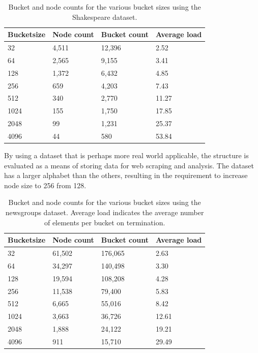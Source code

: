 \begin{table}[h]
    \centering
    \begin{tabular}[here]{ l l l l }
        \hline
        Bucketsize&  Node count & Bucket count& Average load  \\\hline
        32        &  4,511      & 12,396      & 2.52 \\
        64        &  2,565      & 9,155       & 3.41 \\
        128       &  1,372      & 6,432       & 4.85 \\
        256       &  659        & 4,203       & 7.43 \\
        512       &  340        & 2,770       & 11.27\\
        1024      &  155        & 1,750       & 17.85\\ 
        2048      &  99         & 1,231       & 25.37\\ 
        4096      &  44         & 580         & 53.84\\\hline 
    \end{tabular}
    \caption{Bucket and node counts for the various bucket sizes using the Shakespeare
        dataset.}
    \label{tab:bncounts_shakespeare}
\end{table}


By using a dataset that is perhaps more real world applicable, the structure is
evaluated as a means of storing data for web scraping and analysis. The dataset has a 
larger alphabet than the others, resulting in the requirement to increase
node size to 256 from 128.

\begin{table}[h]
    \centering
    \begin{tabular}[here]{ l l l l }
        \hline
        Bucketsize& Node count  & Bucket count & Average load  \\\hline
        32        &  61,502     & 176,065      & 2.63\\
        64        &  34,297     & 140,498      & 3.30\\
        128       &  19,594     & 108,208      & 4.28\\
        256       &  11,538     & 79,400       & 5.83\\
        512       &  6,665      & 55,016       & 8.42\\
        1024      &  3,663      & 36,726       & 12.61\\ 
        2048      &  1,888      & 24,122       & 19.21\\ 
        4096      &  911        & 15,710       & 29.49\\\hline 
    \end{tabular}
    \caption{Bucket and node counts for the various bucket sizes using the
    newsgroups dataset. Average load indicates the average number of elements
    per bucket on termination.}
    \label{tab:bncounts_ngrp}
\end{table}

